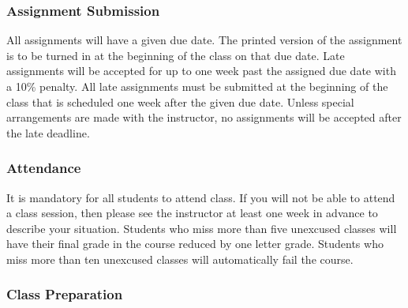 \subsubsection*{Assignment Submission}

All assignments will have a given due date.  The printed version of the assignment is to be turned in at the beginning
of the class on that due date.  Late assignments will be accepted for up to one week past the assigned due date with a
10\% penalty.  All late assignments must be submitted at the beginning of the class that is scheduled one week after the
given due date.  Unless special arrangements are made with the instructor, no assignments will be accepted after the
late deadline.

\subsubsection*{Attendance}

It is mandatory for all students to attend class.  If you will not be able to attend a class session, then please see
the instructor at least one week in advance to describe your situation.  Students who miss more than five unexcused
classes will have their final grade in the course reduced by one letter grade.  Students who miss more than ten
unexcused classes will automatically fail the course.

\subsubsection*{Class Preparation}

% 

